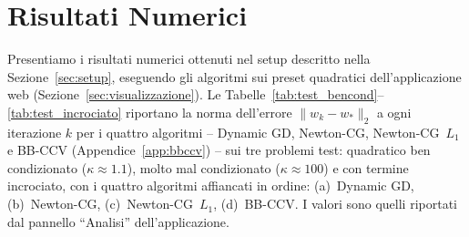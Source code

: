 \documentclass[italian, a4paper, twoside, binding=6mm]{sapthesis}
\begin{document}
\section{Risultati Numerici}\label{sec:risultati}

Presentiamo i risultati numerici ottenuti nel setup descritto nella
Sezione~\ref{sec:setup}, eseguendo gli algoritmi sui preset quadratici
dell'applicazione web (Sezione~\ref{sec:visualizzazione}). Le
Tabelle~\ref{tab:test_bencond}--\ref{tab:test_incrociato} riportano la norma
dell'errore $\|w_k - w_*\|_2$ a ogni iterazione $k$ per i quattro algoritmi
-- Dynamic GD, Newton-CG, Newton-CG~$L_1$ e BB-CCV
(Appendice~\ref{app:bbccv}) -- sui tre problemi test: quadratico ben
condizionato ($\kappa \approx 1.1$), molto mal condizionato
($\kappa \approx 100$) e con termine incrociato, con i quattro algoritmi
affiancati in ordine: (a)~Dynamic GD, (b)~Newton-CG, (c)~Newton-CG~$L_1$,
(d)~BB-CCV. I valori sono quelli riportati dal pannello ``Analisi''
dell'applicazione.
\end{document}
